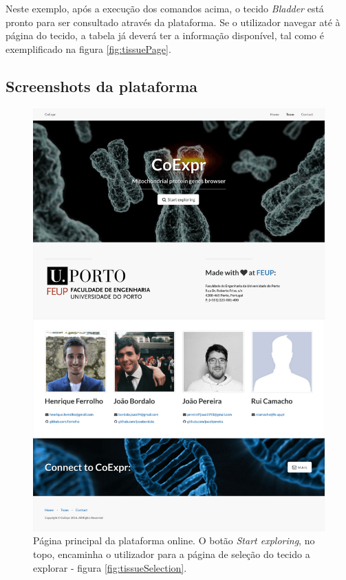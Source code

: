 \medskip

Neste exemplo, após a execução dos comandos acima, o tecido \textit{Bladder} está pronto para ser consultado através da plataforma. Se o utilizador navegar até à página do tecido, a tabela já deverá ter a informação disponível, tal como é exemplificado na figura \ref{fig:tissuePage}.

\newpage


\subsection{Screenshots da plataforma}

\begin{figure}[ht]
    \centering
    \includegraphics[width=0.7\linewidth]{res/home.png}
    \caption{Página principal da plataforma online. O botão \textit{Start exploring}, no topo, encaminha o utilizador para a página de seleção do tecido a explorar - figura \ref{fig:tissueSelection}.}
    \label{fig:homePage}
\end{figure}


